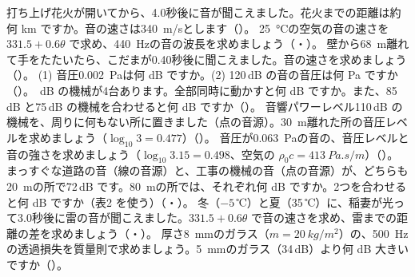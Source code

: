 \bkendproblems
{}
\bkproblem 打ち上げ花火が開いてから、4.0秒後に音が聞こえました。花火までの距離は約何 km ですか。音の速さは\qty{340}{m/s}とします（\nobreak{}\nobreak）。
\bkproblem \qty{25}{\celsius}の空気の音の速さを $331.5+0.6\theta$ で求め、\qty{440}{Hz}の音の波長を求めましょう（\nobreak{}・\nobreak）。
\bkproblem 壁から\qty{68}{m}離れて手をたたいたら、こだまが0.40秒後に聞こえました。音の速さを求めましょう（\nobreak{}\nobreak）。
\bkproblem (1) 音圧\qty{0.002}{Pa}は何 dB ですか。(2) 120\,dB の音の音圧は何 Pa ですか（\nobreak{}\nobreak）。
\,dB の機械が4台あります。全部同時に動かすと何 dB ですか。また、85\,dB と75\,dB の機械を合わせると何 dB ですか（\nobreak{}\nobreak）。
\bkproblem 音響パワーレベル110\,dB の機械を、周りに何もない所に置きました（点の音源）。\qty{30}{m}離れた所の音圧レベルを求めましょう（$\log_{10}3=0.477$）（\nobreak{}\nobreak）。
\bkproblem 音圧が\qty{0.063}{Pa}の音の、音圧レベルと音の強さを求めましょう（$\log_{10}3.15=0.498$、空気の $\rho_0c=\qty{413}{Pa.s/m}$）（\nobreak{}\nobreak）。
\bkproblem まっすぐな道路の音（線の音源）と、工事の機械の音（点の音源）が、どちらも\qty{20}{m}の所で72\,dB です。\qty{80}{m}の所では、それぞれ何 dB ですか。2つを合わせると何 dB ですか（表2 を使う）（\nobreak{}・\nobreak）。
\bkproblem 冬（$-5$\,℃）と夏（35\,℃）に、稲妻が光って3.0秒後に雷の音が聞こえました。$331.5+0.6\theta$ で音の速さを求め、雷までの距離の差を求めましょう（\nobreak{}・\nobreak）。
\bkproblem 厚さ\qty{8}{mm}のガラス（$m=\qty{20}{kg/m^2}$）の、\qty{500}{Hz}の透過損失を質量則で求めましょう。\qty{5}{mm}のガラス（34\,dB）より何 dB 大きいですか（\nobreak{}\nobreak）。
